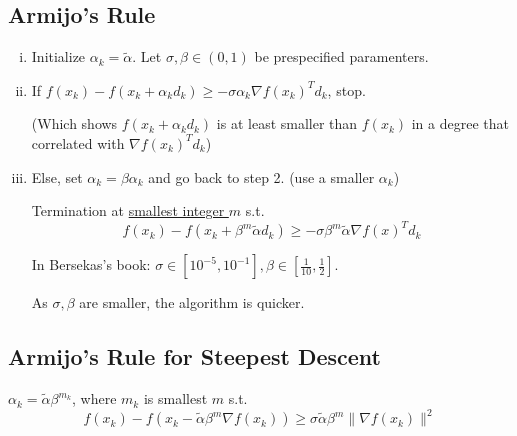 \documentclass[11pt,a4paper]{article}
\begin{document}
\subsection*{Armijo's Rule}
\begin{enumerate}[(i)]
    \item Initialize $\alpha_k=\tilde{\alpha}$. Let $\sigma,\beta \in (0,1)$ be prespecified paramenters.
    \item If $f(x_k)-f(x_k+\alpha_k d_k)\geq-\sigma \alpha_k \nabla f(x_k)^T d_k$, stop.
    
    (Which shows $f(x_k+\alpha_k d_k)$ is at least smaller than $f(x_k)$ in a degree that correlated with $\nabla f(x_k)^T d_k$)
    \item Else, set $\alpha_k=\beta\alpha_k$ and go back to step 2. (use a smaller $\alpha_k$)
    
    Termination at \underline{smallest integer $m$} s.t. $$f(x_k)-f(x_k+\beta^m \tilde{\alpha} d_k)\geq-\sigma\beta^m \tilde{\alpha}\nabla f(x)^T d_k$$

    In Bersekas's book: $\sigma\in[10^{-5},10^{-1}],\beta\in[\frac{1}{10},\frac{1}{2}]$.

    As $\sigma,\beta$ are smaller, the algorithm is quicker.
\end{enumerate}

\subsection*{Armijo's Rule for Steepest Descent}
$\alpha_k=\tilde{\alpha}\beta^{m_k}$, where $m_k$ is smallest $m$ s.t. $$f(x_k)-f(x_k-\tilde{\alpha}\beta^{m} \nabla f(x_k))\geq \sigma\tilde{\alpha}\beta^{m}\|\nabla f(x_k)\|^2$$
\end{document}
